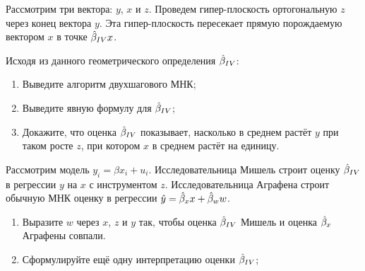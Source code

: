 \begin{problem}
Рассмотрим три вектора: $y$, $x$ и $z$.
Проведем гипер-плоскость ортогональную $z$ через конец вектора $y$.
Эта гипер-плоскость пересекает прямую порождаемую вектором $x$ в точке $\hat{\beta}_{IV}x$.

Исходя из данного геометрического определения $\hat{\beta}_{IV}$:
\begin{enumerate}
  \item Выведите алгоритм двухшагового МНК;
  \item Выведите явную формулу для $\hat{\beta}_{IV}$;
  \item Докажите, что оценка $\hat{\beta}_{IV}$ показывает, насколько в среднем растёт $y$ при таком росте $z$, при котором $x$ в среднем растёт на единицу.
\end{enumerate}

  \begin{sol}
  \end{sol}

\end{problem}


\begin{problem}
 Рассмотрим модель $y_i = \beta x_i + u_i$.
  Исследовательница Мишель строит оценку $\hat{\beta}_{IV}$ в регрессии $y$ на $x$ с инструментом $z$.
  Исследовательница Аграфена строит обычную МНК оценку в регрессии $\hat y = \hat{\beta}_{x} x + \hat{\beta}_{w} w$.

  \begin{enumerate}
    \item Выразите $w$ через $x$, $z$ и $y$ так, чтобы оценка $\hat{\beta}_{IV}$ Мишель и оценка $\hat{\beta}_{x}$ Аграфены совпали.
    \item Сформулируйте ещё одну интерпретацию оценки $\hat{\beta}_{IV}$;
  \end{enumerate}
  \begin{sol}

  \end{sol}
\end{problem}


